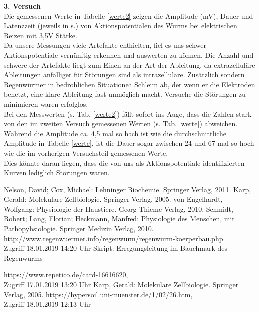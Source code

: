 \documentclass[11pt]{article}
\begin{document}
\textbf{3. Versuch}\\
Die gemessenen Werte in Tabelle \ref{werte2} zeigen die Amplitude (mV), Dauer und Latenzzeit (jeweils in s.) von Aktionspotentialen des Wurms bei elektrischen Reizen mit 3,5V Stärke.\\
Da unsere Messungen viele Artefakte enthielten, fiel es uns schwer Aktionspotentiale vernünftig erkennen und auswerten zu können. Die Anzahl und schwere der Artefakte liegt zum Einen an der Art der Ableitung, da extrazelluläre Ableitungen anfälliger für Störungen sind als intrazelluläre. Zusätzlich sondern Regenwürmer in bedrohlichen Situationen Schleim ab, der wenn er die Elektroden benetzt, eine klare Ableitung fast unmöglich macht. Versuche die Störungen zu minimieren waren erfolglos.\\
Bei den Messwerten (s. Tab. \ref{werte2}) fällt sofort ins Auge, dass die Zahlen stark von den im zweiten Versuch gemessenen Werten (s. Tab. \ref{werte}) abweichen. Während die Amplitude ca. 4,5 mal so hoch ist wie die durchschnittliche Amplitude in Tabelle \ref{werte}, ist die Dauer sogar zwischen 24 und 67 mal so hoch wie die im vorherigen Versuchsteil gemessenen Werte.\\
Dies könnte daran liegen, dass die von uns als Aktionspotentiale identifizierten Kurven lediglich Störungen waren. 


\begin{thebibliography}{999}
 Nelson, David; Cox, Michael: Lehninger Biochemie. Springer Verlag, 2011.
 Karp, Gerald: Molekulare Zellbiologie. Springer Verlag, 2005.
 von Engelhardt, Wolfgang: Physiologie der Haustiere. Georg Thieme Verlag, 2010. 
 Schmidt, Robert; Lang, Florian; Heckmann, Manfred: Physiologie des Menschen, mit Pathopyhsiologie. Springer Medizin Verlag, 2010. 
 \url{http://www.regenwuermer.info/regenwurm/regenwurm-koerperbau.php} \\Zugriff 18.01.2019 14:20 Uhr
 Skript: Erregungsleitung im Bauchmark des Regenwurms

 \url{https://www.repetico.de/card-16616620}, \\Zugriff 17.01.2019 13:20 Uhr
 Karp, Gerald: Molekulare Zellbiologie. Springer Verlag, 2005.
 \url{https://hypersoil.uni-muenster.de/1/02/26.htm}, \\Zugriff 18.01.2019 12:13 Uhr
\end{thebibliography}
\end{document}
